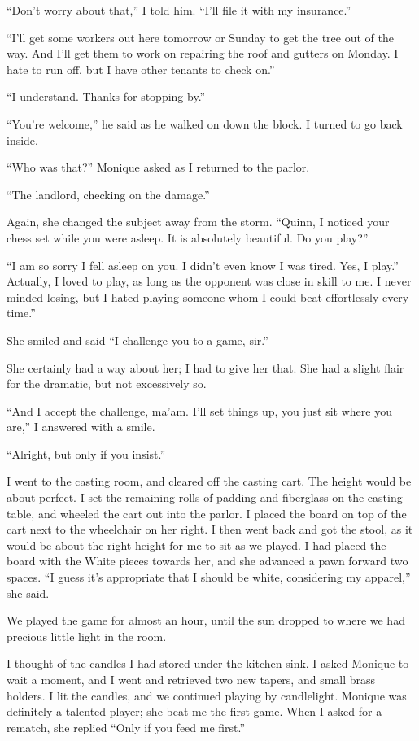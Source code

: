 ``Don't worry about that,'' I told him. ``I'll file it with my insurance.''

``I'll get some workers out here tomorrow or Sunday to get the tree out of the way. And
I'll get them to work on repairing the roof and gutters on Monday. I hate to run off, but I have
other tenants to check on.''

``I understand. Thanks for stopping by.''

``You're welcome,'' he said as he walked on down the block. I turned to go back inside.

``Who was that?'' Monique asked as I returned to the parlor.

``The landlord, checking on the damage.''

Again, she changed the subject away from the storm. ``Quinn, I noticed your chess set while
you were asleep. It is absolutely beautiful. Do you play?''

``I am so sorry I fell asleep on you. I didn't even know I was tired. Yes, I play.''
Actually, I loved to play, as long as the opponent was close in skill to me. I never minded
losing, but I hated playing someone whom I could beat effortlessly every time.''

She smiled and said ``I challenge you to a game, sir.''

She certainly had a way about her; I had to give her that. She had a slight flair for the
dramatic, but not excessively so.

``And I accept the challenge, ma'am. I'll set things up, you just sit where you are,'' I
answered with a smile.

``Alright, but only if you insist.''

I went to the casting room, and cleared off the casting cart. The height would be about
perfect. I set the remaining rolls of padding and fiberglass on the casting table, and wheeled
the cart out into the parlor. I placed the board on top of the cart next to the wheelchair on
her right. I then went back and got the stool, as it would be about the right height for me to
sit as we played. I had placed the board with the White pieces towards her, and she advanced a
pawn forward two spaces. ``I guess it's appropriate that I should be white, considering my
apparel,'' she said.

We played the game for almost an hour, until the sun dropped to where we had precious
little light in the room.

I thought of the candles I had stored under the kitchen sink. I asked Monique to wait a
moment, and I went and retrieved two new tapers, and small brass holders. I lit the candles, and
we continued playing by candlelight. Monique was definitely a talented player; she beat me the
first game. When I asked for a rematch, she replied ``Only if you feed me first.''

